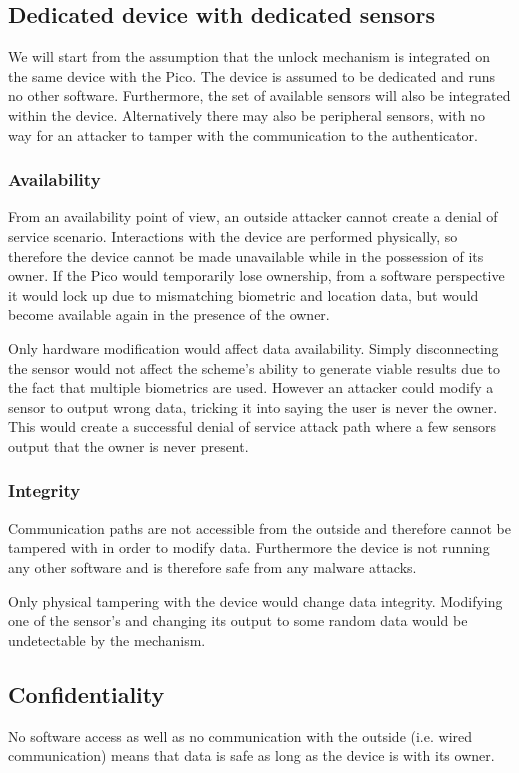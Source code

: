 \subsection{Dedicated device with dedicated sensors}
We will start from the assumption that the unlock mechanism is integrated on the same device with the Pico. The device is assumed to be dedicated and runs no other software. Furthermore, the set of available sensors will also be integrated within the device. Alternatively there may also be peripheral sensors, with no way for an attacker to tamper with the communication to the authenticator. 

	\subsubsection*{Availability}
	From an availability point of view, an outside attacker cannot create a denial of service scenario. Interactions with the device are performed physically, so therefore the device cannot be made unavailable while in the possession of its owner. If the Pico would temporarily lose ownership, from a software perspective it would lock up due to mismatching biometric and location data, but would become available again in the presence of the owner. 
	
	Only hardware modification would affect data availability. Simply disconnecting the sensor would not affect the scheme's ability to generate viable results due to the fact that multiple biometrics are used. However an attacker could modify a sensor to output wrong data, tricking it into saying the user is never the owner. This would create a successful denial of service attack path where a few sensors output that the owner is never present. 
	
	\subsubsection*{Integrity}
	Communication paths are not accessible from the outside and therefore cannot be tampered with in order to modify data. Furthermore the device is not running any other software and is therefore safe from any malware attacks. 
	
	Only physical tampering with the device would change data integrity. Modifying one of the sensor's and changing its output to some random data would be undetectable by the mechanism. 
	
	\subsection*{Confidentiality}
	No software access as well as no communication with the outside (i.e. wired communication) means that data is safe as long as the device is with its owner.
	
